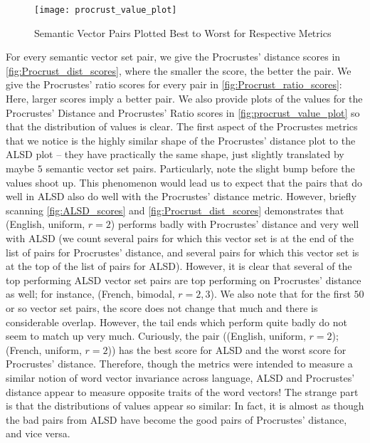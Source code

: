 \documentclass[12pt, usenames]{article}
\theoremstyle{definition}
\theoremstyle{definition}
\theoremstyle{definition}
\begin{document}
\begin{figure}
\texttt{[image: procrust\_value\_plot]}
\centering
\caption{Semantic Vector Pairs Plotted Best to Worst for Respective Metrics}
\label{fig:procrust_value_plot}
\end{figure}

For every semantic vector set pair, we give the Procrustes' distance scores in \autoref{fig:Procrust_dist_scores}, where the smaller the score, the better the pair. We give the Procrustes' ratio scores for every pair in \autoref{fig:Procrust_ratio_scores}: Here, larger scores imply a better pair. We also provide plots of the values for the Procrustes' Distance and Procrustes' Ratio scores in \autoref{fig:procrust_value_plot} so that the distribution of values is clear.
The first aspect of the Procrustes metrics that we notice is the highly similar shape of the Procrustes' distance plot to the ALSD plot -- they have practically the same shape, just slightly translated by maybe $5$ semantic vector set pairs. Particularly, note the slight bump before the values shoot up. This phenomenon would lead us to expect that the pairs that do well in ALSD also do well with the Procrustes' distance metric. However, briefly scanning \autoref{fig:ALSD_scores} and 
\autoref{fig:Procrust_dist_scores} demonstrates that (English, uniform, $r = 2$) performs badly with Procrustes' distance and very well with ALSD (we count several pairs for which this vector set is at the end of the list of pairs for Procrustes' distance, and several pairs for which this vector set is at the top of the list of pairs for ALSD). However, it is clear that several of the top performing ALSD vector set pairs are top performing on Procrustes' distance as well; for instance, (French, bimodal, $r = 2, 3$). We also note that for the first $50$ or so vector set pairs, the score does not change that much and there is considerable overlap. However, the tail ends which perform quite badly do not seem to match up very much. Curiously, the pair ((English, uniform, $r = 2$); (French, uniform, $r = 2$)) has the best score for ALSD and the worst score for Procrustes' distance. Therefore, though the metrics were intended to measure a similar notion of word vector invariance across language, ALSD and Procrustes' distance appear to measure opposite traits of the word vectors! The strange part is that the distributions of values appear so similar: In fact, it is almost as though the bad pairs from ALSD have become the good pairs of Procrustes' distance, and vice versa. 
\end{document}
